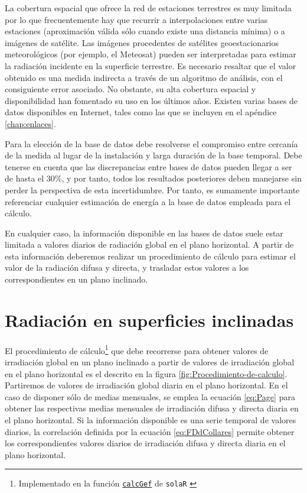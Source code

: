La cobertura espacial que ofrece la red de estaciones terrestres es
muy limitada por lo que frecuentemente hay que recurrir a interpolaciones
entre varias estaciones (aproximación válida sólo cuando existe una
distancia mínima) o a imágenes de satélite. Las imágenes procedentes
de satélites geoestacionarios meteorológicos (por ejemplo, el Meteosat)
pueden ser interpretadas para estimar la radiación incidente en la
superficie terrestre. Es necesario resaltar que el valor obtenido
es una medida indirecta a través de un algoritmo de análisis, con
el consiguiente error asociado. No obstante, su alta cobertura espacial
y disponibilidad han fomentado su uso en los últimos años. Existen
varias bases de datos disponibles en Internet, tales como las que se
incluyen en el apéndice \ref{chap:enlaces}.

Para la elección de la base de datos debe resolverse el compromiso
entre cercanía de la medida al lugar de la instalación y larga duración
de la base temporal. Debe tenerse en cuenta que las discrepancias
entre bases de datos pueden llegar a ser de hasta el 30\%, y por tanto,
todos los resultados posteriores deben manejarse sin perder la perspectiva
de esta incertidumbre. Por tanto, es sumamente importante referenciar
cualquier estimación de energía a la base de datos empleada para el
cálculo.

En cualquier caso, la información disponible en las bases de datos
suele estar limitada a valores diarios de radiación global en el plano
horizontal. A partir de esta información deberemos realizar un procedimiento
de cálculo para estimar el valor de la radiación difusa y directa,
y trasladar estos valores a los correspondientes en un plano inclinado.


\section{Radiación en superficies inclinadas}

El procedimiento de cálculo\footnote{Implementado en la función
  \href{http://search.r-project.org/R/library/solaR/html/calcGef.html}{\texttt{calcGef}}
  de \texttt{solaR} \cite{Perpinan2012b}} que debe recorrerse para obtener valores
de irradiación global en un plano inclinado a partir de valores de
irradiación global en el plano horizontal es el descrito en la figura
\ref{fig:Procedimiento-de-calculo}. Partiremos de valores de
irradiación global diaria en el plano horizontal. 
En el caso de disponer sólo de medias mensuales, se emplea la ecuación
\ref{eq:Page} para obtener las respectivas medias mensuales
de irradiación difusa y directa diaria en el plano
horizontal. Si la información disponible es una serie temporal de
valores diarios, la correlación definida por la ecuación
\ref{eq:FDdCollares} permite obtener los correspondientes valores
diarios de irradiación difusa y directa diaria en el plano horizontal.

